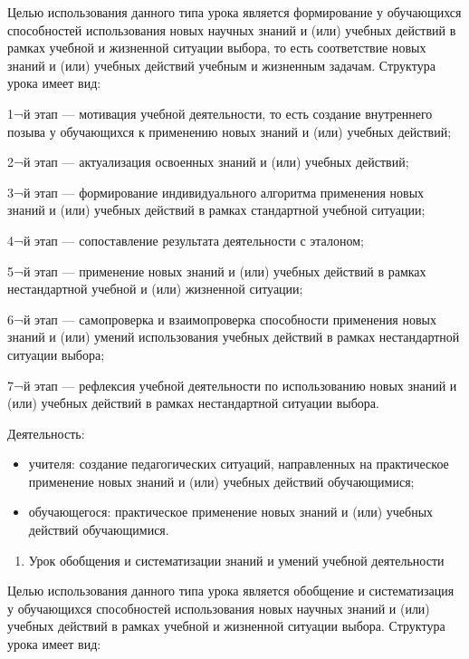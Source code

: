 \documentclass[
  11pt,
  russian,
]{book}
\providecommand{\tightlist}{%
  \setlength{\itemsep}{0pt}\setlength{\parskip}{0pt}}
\begin{document}
Целью использования данного типа урока является формирование у обучающихся способностей использования новых научных знаний и (или) учебных действий в рамках учебной и жизненной ситуации выбора, то есть соответствие новых знаний и (или) учебных действий учебным и жизненным задачам. Структура урока имеет вид:

1¬й этап --- мотивация учебной деятельности, то есть создание внутреннего позыва у обучающихся к применению новых знаний и (или) учебных действий;

2¬й этап --- актуализация освоенных знаний и (или) учебных действий;

3¬й этап --- формирование индивидуального алгоритма применения новых знаний и (или) учебных действий в рамках стандартной учебной ситуации;

4¬й этап --- сопоставление результата деятельности с эталоном;

5¬й этап --- применение новых знаний и (или) учебных действий в рамках нестандартной учебной и (или) жизненной ситуации;

6¬й этап --- самопроверка и взаимопроверка способности применения новых знаний и (или) умений использования учебных действий в рамках нестандартной ситуации выбора;

7¬й этап --- рефлексия учебной деятельности по использованию новых знаний и (или) учебных действий в рамках нестандартной ситуации выбора.

Деятельность:

\begin{itemize}
\item
  учителя: создание педагогических ситуаций, направленных на практическое применение новых знаний и (или) учебных действий обучающимися;
\item
  обучающегося: практическое применение новых знаний и (или) учебных действий обучающимися.
\end{itemize}

\begin{enumerate}
\def\labelenumi{\arabic{enumi}.}
\setcounter{enumi}{2}
\tightlist
\item
  Урок обобщения и систематизации знаний и умений учебной деятельности
\end{enumerate}

Целью использования данного типа урока является обобщение и систематизация у обучающихся способностей использования новых научных знаний и (или) учебных действий в рамках учебной и жизненной ситуации выбора. Структура урока имеет вид:
\end{document}
